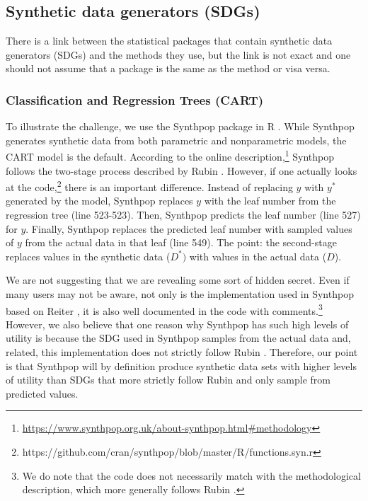 \documentclass[runningheads]{llncs}
\begin{document}
\subsection{Synthetic data generators (SDGs)}


There is a link between the statistical packages that contain synthetic data generators (SDGs) and the methods they use, but the link is not exact and one should not assume that a package is the same as the method or visa versa.

\subsubsection{Classification and Regression Trees (CART)}

To illustrate the challenge, we use the Synthpop package in R \citep{nowok2016synthpop}.  While Synthpop generates synthetic data from both parametric and nonparametric models, the CART model is the default.  According to the online description,\footnote{\url{https://www.synthpop.org.uk/about-synthpop.html\#methodology}} Synthpop follows the two-stage process described by Rubin \citep{rubin1993statistical}.  However, if one actually looks at the code,\footnote{https://github.com/cran/synthpop/blob/master/R/functions.syn.r} there is an important difference.  Instead of replacing $y$ with $y^*$ generated by the model, Synthpop replaces $y$ with the leaf number from the regression tree (line 523-523).  Then, Synthpop predicts the leaf number (line 527) for $y$.  Finally, Synthpop replaces the predicted leaf number with sampled values of $y$ from the actual data in that leaf (line 549).  The point: the second-stage replaces values in the synthetic data ($D^*)$ with values in the actual data ($D$).  

We are not suggesting that we are revealing some sort of hidden secret.  Even if many users may not be aware, not only is the implementation used in Synthpop based on Reiter \cite{reiter2005using}, it is also well documented in the code with comments.\footnote{We do note that the code does not necessarily match with the methodological description, which more generally follows Rubin \cite{rubin1993statistical}.}  However, we also believe that one reason why Synthpop has such high levels of utility is because the SDG used in Synthpop samples from the actual data and, related, this implementation does not strictly follow Rubin \cite{rubin1993statistical}.   Therefore, our point is that Synthpop will by definition produce synthetic data sets with higher levels of utility than SDGs that more strictly follow Rubin and only sample from predicted values.  
\end{document}
